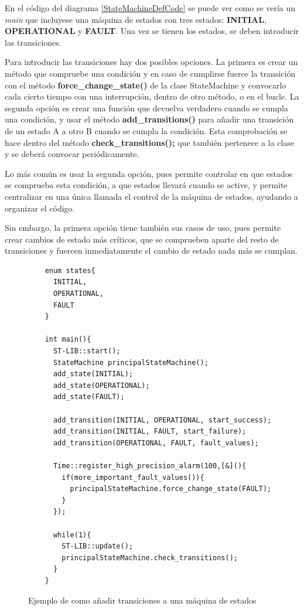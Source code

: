\documentclass{report}
\begin{document}
En el código del diagrama \ref{StateMachineDefCode} se puede ver como se vería un \textit{main} que incluyese una máquina de estados con tres estados: \textbf{INITIAL}, \textbf{OPERATIONAL} y \textbf{FAULT}. Una vez se tienen los estados, se deben introducir las transiciones. 
\par \vspace{0.3cm}
Para introducir las transiciones hay dos posibles opciones. La primera es crear un método que compruebe una condición y en caso de cumplirse fuerce la transición con el método \textbf{force\_change\_state()} de la clase StateMachine y convocarlo cada cierto tiempo con una interrupción, dentro de otro método, o en el bucle. La segunda opción es crear una función que devuelva verdadero cuando se cumpla una condición, y usar el método \textbf{add\_transitions()} para añadir una transición de un estado A a otro B cuando se cumpla la condición. Esta comprobación se hace dentro del método \textbf{check\_transitions();} que también pertenece a la clase y se deberá convocar periódicamente. 
\par \vspace{0.3cm}
Lo más común es usar la segunda opción, pues permite controlar en que estados se comprueba esta condición, a que estados llevará cuando se active, y permite centralizar en una única llamada el control de la máquina de estados, ayudando a organizar el código. \par 
Sin embargo, la primera opción tiene también sus casos de uso, pues permite crear cambios de estado más críticos, que se comprueben aparte del resto de transiciones y fuercen inmediatamente el cambio de estado nada más se cumplan.

\begin{figure}[h]
  \begin{lstlisting}
    enum states{
      INITIAL,
      OPERATIONAL,
      FAULT
    }

    int main(){
      ST-LIB::start();
      StateMachine principalStateMachine();
      add_state(INITIAL);
      add_state(OPERATIONAL);
      add_state(FAULT);

      add_transition(INITIAL, OPERATIONAL, start_success);
      add_transition(INITIAL, FAULT, start_failure);
      add_transition(OPERATIONAL, FAULT, fault_values);

      Time::register_high_precision_alarm(100,[&](){
        if(more_important_fault_values()){
          principalStateMachine.force_change_state(FAULT);
        }
      });

      while(1){
        ST-LIB::update();
        principalStateMachine.check_transitions();
      }
    }
  \end{lstlisting}
  \caption{Ejemplo de como añadir transiciones a una máquina de estados}
  \label{StateMachineTransitionCode}
\end{figure}
\par \vspace{0.3cm}
\end{document}
